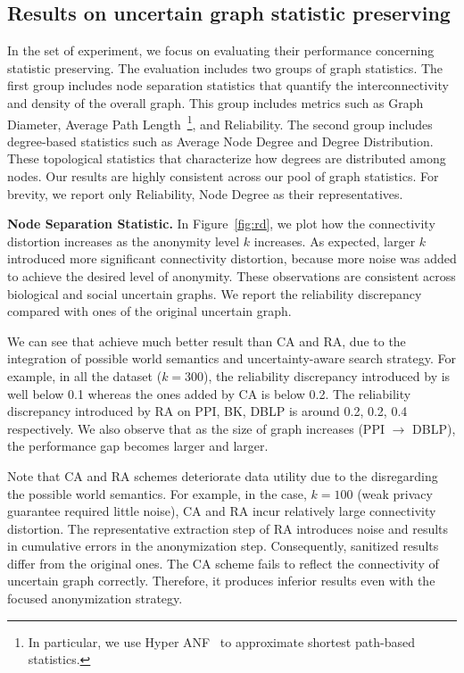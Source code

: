 \subsection{Results on uncertain graph statistic preserving}
In the set of experiment, we focus on evaluating their performance concerning statistic preserving. 
The evaluation includes two groups of graph statistics. 
The first group includes node separation statistics that quantify the interconnectivity and density of the overall graph.   
This group includes metrics such as Graph Diameter, Average  Path  Length~\footnote{In particular, we use Hyper ANF~\cite{Boldi_Rosa_Vigna_2011} to approximate shortest path-based statistics.}, and Reliability. 
The second group includes degree-based statistics such as Average  Node Degree and Degree Distribution.
These topological statistics that characterize how degrees are distributed among nodes. 
Our results are highly consistent across our pool of graph statistics.
For brevity, we report only Reliability, Node Degree as their representatives. 

\textbf{Node Separation Statistic.} 
In Figure~\ref{fig:rd}, we plot how the connectivity distortion increases as the anonymity level $k$ increases. 
As expected, larger $k$ introduced more significant connectivity distortion, because more noise was added to achieve the desired level of anonymity.   
These observations are consistent across biological and social uncertain graphs.
We report the reliability discrepancy compared with ones of the original uncertain graph. 

We can see that {\methodName} achieve much better result than CA and RA, due to the integration of possible world semantics and uncertainty-aware search strategy. 
For example, in all the dataset ($k=300$), the reliability discrepancy introduced by {\methodName} is well below 0.1 whereas the ones added by CA is below 0.2. The reliability discrepancy introduced by RA on PPI, BK, DBLP is around 0.2, 0.2, 0.4 respectively. We also observe that as the size of graph increases (PPI $\rightarrow$ DBLP), the performance gap becomes larger and larger.

Note that CA and RA schemes deteriorate data utility due to the disregarding the possible world semantics. 
For example, in the case, $k=100$ (weak privacy guarantee required little noise), CA and RA incur relatively large connectivity distortion. 
The representative extraction step of RA introduces noise and results in cumulative errors in the anonymization step. Consequently, sanitized results differ from the original ones. 
The CA scheme fails to reflect the connectivity of uncertain graph correctly. Therefore, it produces inferior results even with the focused anonymization strategy. 


